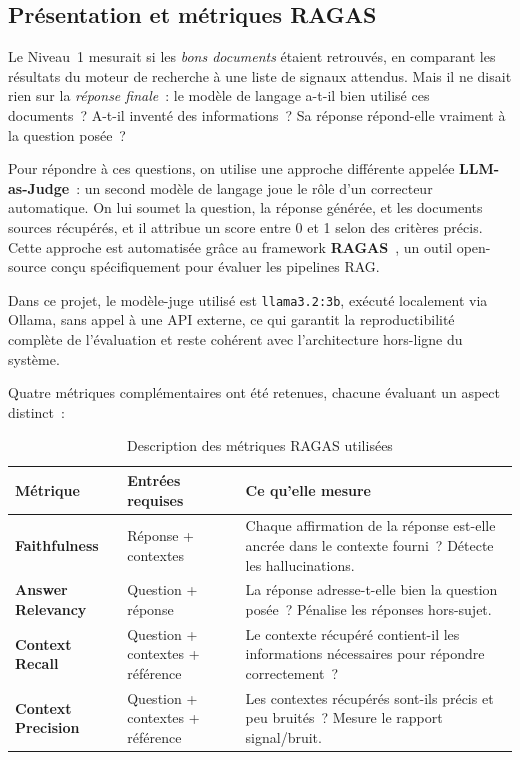 \subsection{Présentation et métriques RAGAS}

Le Niveau~1 mesurait si les \emph{bons documents} étaient retrouvés, en comparant les résultats du moteur de recherche à une liste de signaux attendus. Mais il ne disait rien sur la \emph{réponse finale}~: le modèle de langage a-t-il bien utilisé ces documents~? A-t-il inventé des informations~? Sa réponse répond-elle vraiment à la question posée~?

Pour répondre à ces questions, on utilise une approche différente appelée \textbf{LLM-as-Judge}~: un second modèle de langage joue le rôle d'un correcteur automatique. On lui soumet la question, la réponse générée, et les documents sources récupérés, et il attribue un score entre 0 et 1 selon des critères précis. Cette approche est automatisée grâce au framework \textbf{RAGAS}~\cite{es2023ragas}, un outil open-source conçu spécifiquement pour évaluer les pipelines RAG.

Dans ce projet, le modèle-juge utilisé est \texttt{llama3.2:3b}, exécuté localement via Ollama, sans appel à une API externe, ce qui garantit la reproductibilité complète de l'évaluation et reste cohérent avec l'architecture hors-ligne du système.

Quatre métriques complémentaires ont été retenues, chacune évaluant un aspect distinct~:

\begin{table}[H]
\centering
\caption{Description des métriques RAGAS utilisées}
\label{tab:ragas-metrics-desc}
\begin{tabular}{|p{3.8cm}|p{4.2cm}|p{5.5cm}|}
\hline
\textbf{Métrique} & \textbf{Entrées requises} & \textbf{Ce qu'elle mesure} \\
\hline
\textbf{Faithfulness} &
  Réponse + contextes &
  Chaque affirmation de la réponse est-elle ancrée dans le contexte fourni~? Détecte les hallucinations. \\
\hline
\textbf{Answer Relevancy} &
  Question + réponse &
  La réponse adresse-t-elle bien la question posée~? Pénalise les réponses hors-sujet. \\
\hline
\textbf{Context Recall} &
  Question + contextes + référence &
  Le contexte récupéré contient-il les informations nécessaires pour répondre correctement~? \\
\hline
\textbf{Context Precision} &
  Question + contextes + référence &
  Les contextes récupérés sont-ils précis et peu bruités~? Mesure le rapport signal/bruit. \\
\hline
\end{tabular}
\end{table}

